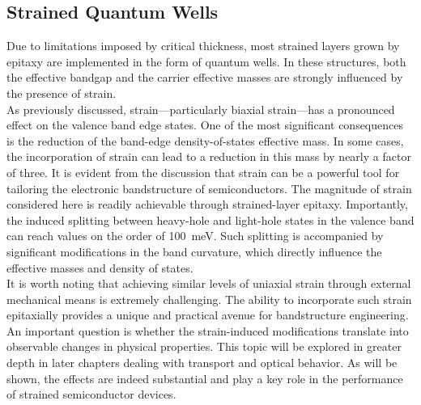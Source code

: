 \subsection{Strained Quantum Wells}
Due to limitations imposed by critical thickness, most strained layers grown by epitaxy are implemented in the form of quantum wells. In these structures, both the effective bandgap and the carrier effective masses are strongly influenced by the presence of strain.\\
As previously discussed, strain—particularly biaxial strain—has a pronounced effect on the valence band edge states. One of the most significant consequences is the reduction of the band-edge density-of-states effective mass. In some cases, the incorporation of strain can lead to a reduction in this mass by nearly a factor of three.
It is evident from the discussion that strain can be a powerful tool for tailoring the electronic bandstructure of semiconductors. The magnitude of strain considered here is readily achievable through strained-layer epitaxy. Importantly, the induced splitting between heavy-hole and light-hole states in the valence band can reach values on the order of 100~meV. Such splitting is accompanied by significant modifications in the band curvature, which directly influence the effective masses and density of states.\\
It is worth noting that achieving similar levels of uniaxial strain through external mechanical means is extremely challenging. The ability to incorporate such strain epitaxially provides a unique and practical avenue for bandstructure engineering.\\
An important question is whether the strain-induced modifications translate into observable changes in physical properties. This topic will be explored in greater depth in later chapters dealing with transport and optical behavior. As will be shown, the effects are indeed substantial and play a key role in the performance of strained semiconductor devices.


